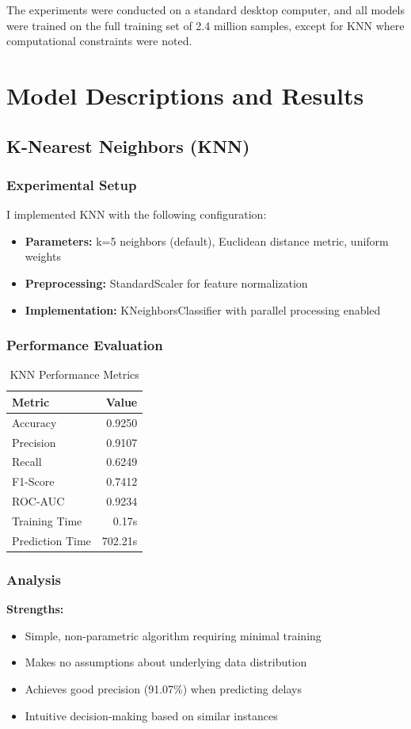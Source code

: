 \documentclass[sigconf]{acmart}
\begin{document}
The experiments were conducted on a standard desktop computer, and all models were trained on the full training set of 2.4 million samples, except for KNN where computational constraints were noted.

\section{Model Descriptions and Results}

\subsection{K-Nearest Neighbors (KNN)}

\subsubsection{Experimental Setup}
I implemented KNN with the following configuration:
\begin{itemize}
    \item \textbf{Parameters:} k=5 neighbors (default), Euclidean distance metric, uniform weights
    \item \textbf{Preprocessing:} StandardScaler for feature normalization
    \item \textbf{Implementation:} KNeighborsClassifier with parallel processing enabled
\end{itemize}

\subsubsection{Performance Evaluation}
\begin{table}[h]
\centering
\caption{KNN Performance Metrics}
\begin{tabular}{lr}
\toprule
Metric & Value \\
\midrule
Accuracy & 0.9250 \\
Precision & 0.9107 \\
Recall & 0.6249 \\
F1-Score & 0.7412 \\
ROC-AUC & 0.9234 \\
Training Time & 0.17s \\
Prediction Time & 702.21s \\
\bottomrule
\end{tabular}
\end{table}

\subsubsection{Analysis}
\textbf{Strengths:}
\begin{itemize}
    \item Simple, non-parametric algorithm requiring minimal training
    \item Makes no assumptions about underlying data distribution
    \item Achieves good precision (91.07\%) when predicting delays
    \item Intuitive decision-making based on similar instances
\end{itemize}
\end{document}
